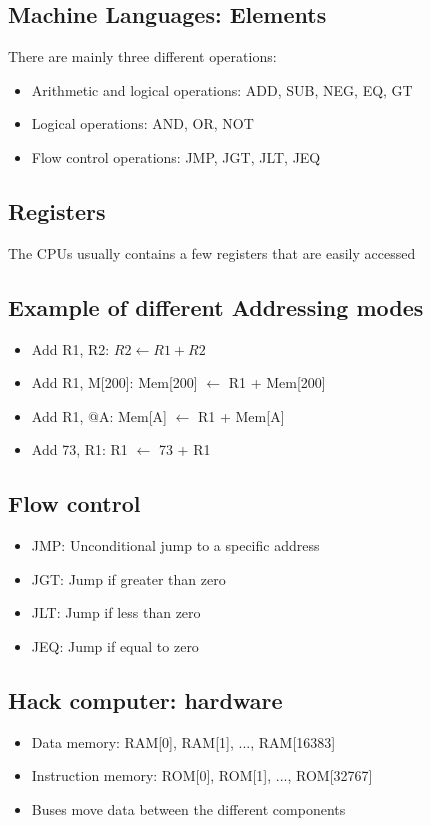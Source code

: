 \documentclass[12pt,a4paper]{article}
\begin{document}
\subsection{Machine Languages: Elements}
There are mainly three different operations:
\begin{itemize}
    \item Arithmetic and logical operations: ADD, SUB, NEG, EQ, GT
    \item Logical operations: AND, OR, NOT
    \item Flow control operations: JMP, JGT, JLT, JEQ
\end{itemize}

\subsection{Registers}
The CPUs usually contains a few registers that are easily accessed

\subsection{Example of different Addressing modes}
\begin{itemize}
    \item Add R1, R2: $R2 \leftarrow R1 + R2$
    \item Add R1, M[200]: Mem[200] $\leftarrow$ R1 + Mem[200]
    \item Add R1, @A: Mem[A] $\leftarrow$ R1 + Mem[A]
    \item Add 73, R1: R1 $\leftarrow$ 73 + R1
\end{itemize}

\subsection{Flow control}
\begin{itemize}
    \item JMP: Unconditional jump to a specific address
    \item JGT: Jump if greater than zero
    \item JLT: Jump if less than zero
    \item JEQ: Jump if equal to zero
\end{itemize}

\subsection{Hack computer: hardware}
\begin{itemize}
    \item Data memory: RAM[0], RAM[1], ..., RAM[16383]
    \item Instruction memory: ROM[0], ROM[1], ..., ROM[32767]
    \item Buses move data between the different components
\end{itemize}
\end{document}

